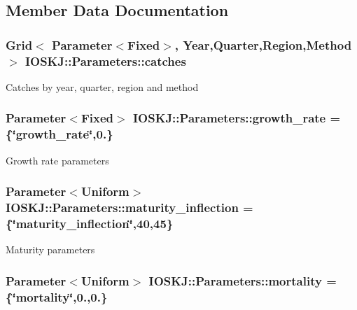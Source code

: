 \subsection{Member Data Documentation}
\hypertarget{classIOSKJ_1_1Parameters_abc031aa9ac8ebeb935c3215d9bae0b55}{
\subsubsection[{catches}]{\setlength{\rightskip}{0pt plus 5cm}Grid$<$ Parameter$<$Fixed$>$, {\bf Year},Quarter,Region,Method $>$ I\-O\-S\-K\-J\-::\-Parameters\-::catches}}\label{classIOSKJ_1_1Parameters_abc031aa9ac8ebeb935c3215d9bae0b55}
Catches by year, quarter, region and method \hypertarget{classIOSKJ_1_1Parameters_a21e9e39539dc623a6d4a179f52c243d6}{
\subsubsection[{growth\-\_\-rate}]{\setlength{\rightskip}{0pt plus 5cm}Parameter$<$Fixed$>$ I\-O\-S\-K\-J\-::\-Parameters\-::growth\-\_\-rate = \{\char`\"{}growth\-\_\-rate\char`\"{},0.\}}}\label{classIOSKJ_1_1Parameters_a21e9e39539dc623a6d4a179f52c243d6}
Growth rate parameters \hypertarget{classIOSKJ_1_1Parameters_a29585748679da64389d2ba756da72c99}{
\subsubsection[{maturity\-\_\-inflection}]{\setlength{\rightskip}{0pt plus 5cm}Parameter$<$Uniform$>$ I\-O\-S\-K\-J\-::\-Parameters\-::maturity\-\_\-inflection = \{\char`\"{}maturity\-\_\-inflection\char`\"{},40,45\}}}\label{classIOSKJ_1_1Parameters_a29585748679da64389d2ba756da72c99}
Maturity parameters \hypertarget{classIOSKJ_1_1Parameters_a3f7804d8ec305804a0a697abcb1b0042}{
\subsubsection[{mortality}]{\setlength{\rightskip}{0pt plus 5cm}Parameter$<$Uniform$>$ I\-O\-S\-K\-J\-::\-Parameters\-::mortality = \{\char`\"{}mortality\char`\"{},0.,0.\}}}\label{classIOSKJ_1_1Parameters_a3f7804d8ec305804a0a697abcb1b0042}
